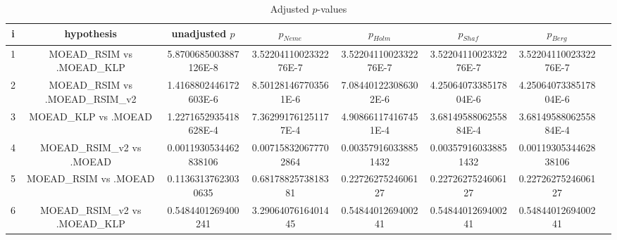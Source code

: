 \documentclass[a4paper,10pt]{article}
\begin{document}
\begin{landscape}
\begin{table}[!htp]
\centering\tiny
\caption{Adjusted $p$-values}
\begin{tabular}{cccccccc}
i&hypothesis&unadjusted $p$&$p_{Neme}$&$p_{Holm}$&$p_{Shaf}$&$p_{Berg}$\\
\hline
1&MOEAD_RSIM vs .MOEAD_KLP&5.8700685003887126E-8&3.5220411002332276E-7&3.5220411002332276E-7&3.5220411002332276E-7&3.5220411002332276E-7\\
2&MOEAD_RSIM vs .MOEAD_RSIM_v2&1.4168802446172603E-6&8.501281467703561E-6&7.084401223086302E-6&4.2506407338517804E-6&4.2506407338517804E-6\\
3&MOEAD_KLP vs .MOEAD&1.2271652935418628E-4&7.362991761251177E-4&4.908661174167451E-4&3.6814958806255884E-4&3.6814958806255884E-4\\
4&MOEAD_RSIM_v2 vs .MOEAD&0.0011930534462838106&0.007158320677702864&0.003579160338851432&0.003579160338851432&0.0011930534462838106\\
5&MOEAD_RSIM vs .MOEAD&0.11363137623030635&0.6817882573818381&0.2272627524606127&0.2272627524606127&0.2272627524606127\\
6&MOEAD_RSIM_v2 vs .MOEAD_KLP&0.5484401269400241&3.2906407616401445&0.5484401269400241&0.5484401269400241&0.5484401269400241\\
\hline
\end{tabular}
\end{table}

\end{landscape}
\end{document}
